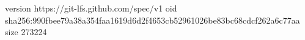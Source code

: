 version https://git-lfs.github.com/spec/v1
oid sha256:990fbee79a38a354faa1619d6d2f4653cb52961026be83bc68cdcf262a6c77aa
size 273224
